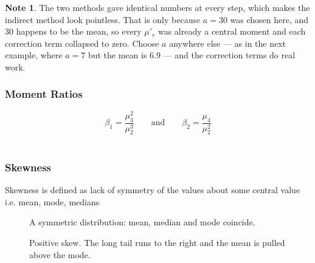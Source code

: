 \documentclass[11pt,a4paper]{article}
\theoremstyle{definition}
\newtheorem{note}[thm]{Note}
\begin{document}
\begin{note}
The two methods gave identical numbers at every step, which makes the indirect method look
pointless. That is only because $a=30$ was chosen here, and $30$ happens to be the mean, so
every $\mu'_r$ was already a central moment and each correction term collapsed to zero.
Choose $a$ anywhere else --- as in the next example, where $a=7$ but the mean is $6.9$ ---
and the correction terms do real work.
\end{note}

\subsubsection{Moment Ratios}
\[\beta_1=\frac{\mu^2_3}{\mu^3_2}\qquad \text{and}\qquad  \beta_2=\frac{\mu_4}{\mu^2_2}\]\\

\subsubsection{Skewness}
Skewness is defined as lack of symmetry of the values about some central value i.e. mean, mode, medians




\begin{figure}[H]
\centering
{}
\caption{A symmetric distribution: mean, median and mode coincide.}
\end{figure}











\vspace{1cm}



\begin{figure}[H]
\centering
{}
\caption{Positive skew. The long tail runs to the right and the mean is pulled above the mode.}
\end{figure}
 
\end{document}
